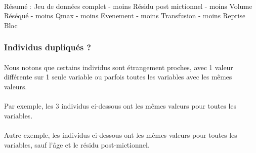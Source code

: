 \documentclass[11pt]{article}
\begin{document}
\paragraph{}
Résumé : Jeu de données complet - moins Résidu post mictionnel - moins
Volume Réséqué - moins Qmax - moins Evenement - moins Transfusion -
moins Reprise Bloc

    \subsubsection{Individus dupliqués ?}\label{individus-dupliquuxe9s}

\paragraph{}
Nous notons que certains individus sont étrangement proches, avec 1
valeur différente sur 1 seule variable ou parfois toutes les variables
avec les mêmes valeurs.

\paragraph{}
    Par exemple, les 3 individus ci-dessous ont les mêmes valeurs pour
toutes les variables.

\paragraph{}


\paragraph{}
    
    Autre exemple, les individus ci-dessous ont les mêmes valeurs pour
toutes les variables, sauf l'âge et le résidu post-mictionnel.

\paragraph{}
\end{document}
